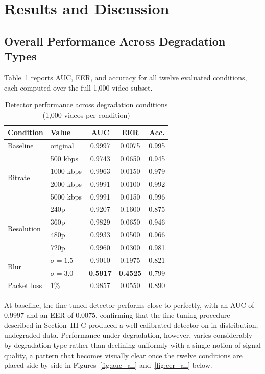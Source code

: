 \documentclass[conference]{IEEEtran}
\begin{document}
\section{Results and Discussion}

\subsection{Overall Performance Across Degradation Types}
Table~\ref{tab:results} reports AUC, EER, and accuracy for all twelve evaluated conditions, each computed over the full 1,000-video subset.

\begin{table}[htbp]
\caption{Detector performance across degradation conditions (1,000 videos per condition)}
\label{tab:results}
\centering
\begin{tabular}{@{}llccc@{}}
\toprule
\textbf{Condition} & \textbf{Value} & \textbf{AUC} & \textbf{EER} & \textbf{Acc.} \\
\midrule
Baseline & original & 0.9997 & 0.0075 & 0.995 \\
\midrule
\multirow{4}{*}{Bitrate} & 500 kbps & 0.9743 & 0.0650 & 0.945 \\
 & 1000 kbps & 0.9963 & 0.0150 & 0.979 \\
 & 2000 kbps & 0.9991 & 0.0100 & 0.992 \\
 & 5000 kbps & 0.9991 & 0.0150 & 0.996 \\
\midrule
\multirow{4}{*}{Resolution} & 240p & 0.9207 & 0.1600 & 0.875 \\
 & 360p & 0.9829 & 0.0650 & 0.946 \\
 & 480p & 0.9933 & 0.0500 & 0.966 \\
 & 720p & 0.9960 & 0.0300 & 0.981 \\
\midrule
\multirow{2}{*}{Blur} & $\sigma=1.5$ & 0.9010 & 0.1975 & 0.821 \\
 & $\sigma=3.0$ & \textbf{0.5917} & \textbf{0.4525} & 0.799 \\
\midrule
Packet loss & 1\% & 0.9857 & 0.0550 & 0.890 \\
\bottomrule
\end{tabular}
\end{table}

At baseline, the fine-tuned detector performs close to perfectly, with an AUC of 0.9997 and an EER of 0.0075, confirming that the fine-tuning procedure described in Section~III-C produced a well-calibrated detector on in-distribution, undegraded data. Performance under degradation, however, varies considerably by degradation type rather than declining uniformly with a single notion of signal quality, a pattern that becomes visually clear once the twelve conditions are placed side by side in Figures~\ref{fig:auc_all} and~\ref{fig:eer_all} below.
\end{document}
